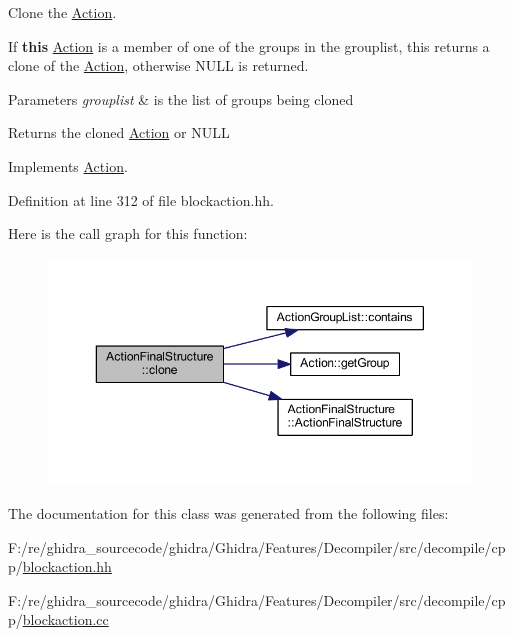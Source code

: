 Clone the \mbox{\hyperlink{class_action}{Action}}. 

If {\bfseries{this}} \mbox{\hyperlink{class_action}{Action}} is a member of one of the groups in the grouplist, this returns a clone of the \mbox{\hyperlink{class_action}{Action}}, otherwise N\+U\+LL is returned. 
\begin{DoxyParams}{Parameters}
{\em grouplist} & is the list of groups being cloned \\
\hline
\end{DoxyParams}
\begin{DoxyReturn}{Returns}
the cloned \mbox{\hyperlink{class_action}{Action}} or N\+U\+LL 
\end{DoxyReturn}


Implements \mbox{\hyperlink{class_action_af8242e41d09e5df52f97df9e65cc626f}{Action}}.



Definition at line 312 of file blockaction.\+hh.

Here is the call graph for this function\+:
\nopagebreak
\begin{figure}[H]
\begin{center}
\leavevmode
\includegraphics[width=350pt]{class_action_final_structure_a2e9f507eb58ffe2c4c7de862eebcb92f_cgraph}
\end{center}
\end{figure}


The documentation for this class was generated from the following files\+:\begin{DoxyCompactItemize}
\item 
F\+:/re/ghidra\+\_\+sourcecode/ghidra/\+Ghidra/\+Features/\+Decompiler/src/decompile/cpp/\mbox{\hyperlink{blockaction_8hh}{blockaction.\+hh}}\item 
F\+:/re/ghidra\+\_\+sourcecode/ghidra/\+Ghidra/\+Features/\+Decompiler/src/decompile/cpp/\mbox{\hyperlink{blockaction_8cc}{blockaction.\+cc}}\end{DoxyCompactItemize}
